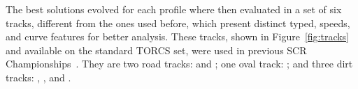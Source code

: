 The best solutions evolved for each profile where then evaluated in a set of six tracks, different from the ones used before, which present distinct typed, speeds, and curve features for better analysis. These tracks, shown in Figure~\ref{fig:tracks} and available on the standard TORCS set, were used in previous SCR Championships~\cite{AUTOPIA2009}. They are two road tracks:  and ; one oval track: ; and three dirt tracks: , , and .






